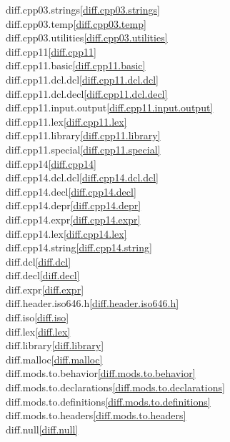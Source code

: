 \begin{multicols}{2}
diff.cpp03.strings\quad\ref{diff.cpp03.strings}\\
diff.cpp03.temp\quad\ref{diff.cpp03.temp}\\
diff.cpp03.utilities\quad\ref{diff.cpp03.utilities}\\
diff.cpp11\quad\ref{diff.cpp11}\\
diff.cpp11.basic\quad\ref{diff.cpp11.basic}\\
diff.cpp11.dcl.dcl\quad\ref{diff.cpp11.dcl.dcl}\\
diff.cpp11.dcl.decl\quad\ref{diff.cpp11.dcl.decl}\\
diff.cpp11.input.output\quad\ref{diff.cpp11.input.output}\\
diff.cpp11.lex\quad\ref{diff.cpp11.lex}\\
diff.cpp11.library\quad\ref{diff.cpp11.library}\\
diff.cpp11.special\quad\ref{diff.cpp11.special}\\
diff.cpp14\quad\ref{diff.cpp14}\\
diff.cpp14.dcl.dcl\quad\ref{diff.cpp14.dcl.dcl}\\
diff.cpp14.decl\quad\ref{diff.cpp14.decl}\\
diff.cpp14.depr\quad\ref{diff.cpp14.depr}\\
diff.cpp14.expr\quad\ref{diff.cpp14.expr}\\
diff.cpp14.lex\quad\ref{diff.cpp14.lex}\\
diff.cpp14.string\quad\ref{diff.cpp14.string}\\
diff.dcl\quad\ref{diff.dcl}\\
diff.decl\quad\ref{diff.decl}\\
diff.expr\quad\ref{diff.expr}\\
diff.header.iso646.h\quad\ref{diff.header.iso646.h}\\
diff.iso\quad\ref{diff.iso}\\
diff.lex\quad\ref{diff.lex}\\
diff.library\quad\ref{diff.library}\\
diff.malloc\quad\ref{diff.malloc}\\
diff.mods.to.behavior\quad\ref{diff.mods.to.behavior}\\
diff.mods.to.declarations\quad\ref{diff.mods.to.declarations}\\
diff.mods.to.definitions\quad\ref{diff.mods.to.definitions}\\
diff.mods.to.headers\quad\ref{diff.mods.to.headers}\\
diff.null\quad\ref{diff.null}\\

\end{multicols}
